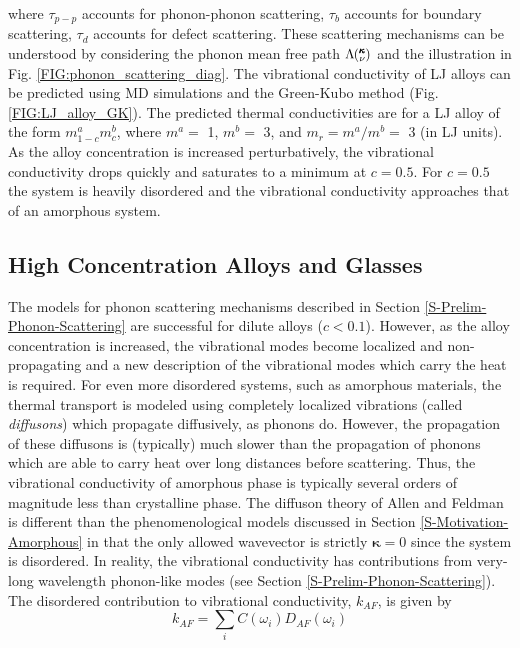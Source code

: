 \documentclass[letterpaper,12pt]{article}
\newcommand{\kv}{\mspace{-4.0mu}\left(\mspace{-8.0mu}\begin{smallmatrix}&\pmb{\kappa} \\&\nu\end{smallmatrix}\mspace{-3.0mu}\right)}
\begin{document}
where $\tau_{p-p}$ accounts for phonon-phonon scattering, $\tau_{b}$ accounts for boundary scattering, $\tau_{d}$ accounts for defect scattering. These scattering mechanisms can be understood by considering the phonon mean free path $\Lambda\kv$ and the illustration in Fig$.$ \ref{FIG:phonon_scattering_diag}.
The vibrational conductivity of LJ alloys can be predicted using MD simulations and the Green-Kubo method (Fig. \ref{FIG:LJ_alloy_GK}). The predicted thermal conductivities are for a LJ alloy of the form $m^a_{1-c}m^b_{c}$, where $m^a =$ 1, $m^b=$ 3, and $m_r = m^a/m^b=$ 3 (in LJ units). As the alloy concentration is increased perturbatively, the vibrational conductivity drops quickly and saturates to a minimum at $c=0.5$. For $c=0.5$ the system is heavily disordered and the vibrational conductivity approaches that of an amorphous system.
\subsection{\label{S-Prelim-Alloy-Amor}High Concentration Alloys and Glasses}
The models for phonon scattering mechanisms described in Section \ref{S-Prelim-Phonon-Scattering} are successful for dilute alloys ($c<0.1$).\cite{klemens1955,klemens1957} However, as the alloy concentration is increased, the vibrational modes become localized and non-propagating and a new description of the vibrational modes which carry the heat is required. For even more disordered systems, such as amorphous materials, the thermal transport is modeled using completely localized vibrations (called \emph{diffusons}) which propagate diffusively, as phonons do.\cite{allen1993} However, the propagation of these diffusons is (typically) much slower than the propagation of phonons which are able to carry heat over long distances before scattering. Thus, the vibrational conductivity of amorphous phase is typically several orders of magnitude less than crystalline phase.\cite{freeman1986,cahill1992}
The diffuson theory of Allen and Feldman is different than the phenomenological models discussed in Section \ref{S-Motivation-Amorphous} in that the only allowed wavevector is strictly $\mathbf{\kappa}= 0$ since the system is disordered. In reality, the vibrational conductivity has contributions from very-long wavelength phonon-like modes (see Section \ref{S-Prelim-Phonon-Scattering}). The disordered contribution to vibrational conductivity, $k_{AF}$, is given by
\begin{equation}\label{EQ:M:k_AF}
k_{AF} = \sum_i C(\omega_i) D_{AF}(\omega_i)
\end{equation}
\end{document}
